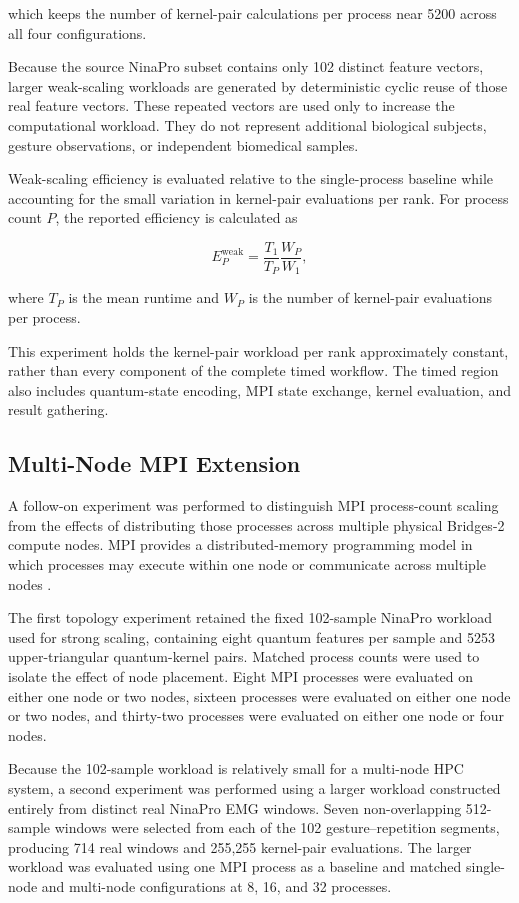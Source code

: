 \documentclass[pdflatex,sn-mathphys-num]{sn-jnl}%
\theoremstyle{thmstyleone}%
\theoremstyle{thmstyletwo}%
\theoremstyle{thmstylethree}%
\begin{document}
which keeps the number of kernel-pair calculations per process near 5200 across
all four configurations.

Because the source NinaPro subset contains only 102 distinct feature vectors,
larger weak-scaling workloads are generated by deterministic cyclic reuse of
those real feature vectors. These repeated vectors are used only to increase the
computational workload. They do not represent additional biological subjects,
gesture observations, or independent biomedical samples.

Weak-scaling efficiency is evaluated relative to the single-process baseline
while accounting for the small variation in kernel-pair evaluations per rank.
For process count \(P\), the reported efficiency is calculated as

\[
E^{\mathrm{weak}}_P
=
\frac{T_1}{T_P}
\frac{W_P}{W_1},
\]

where \(T_P\) is the mean runtime and \(W_P\) is the number of kernel-pair
evaluations per process.

This experiment holds the kernel-pair workload per rank approximately constant,
rather than every component of the complete timed workflow. The timed region
also includes quantum-state encoding, MPI state exchange, kernel evaluation,
and result gathering.


\subsection{Multi-Node MPI Extension}
\label{subsec:multinode-mpi-method}

A follow-on experiment was performed to distinguish MPI process-count scaling
from the effects of distributing those processes across multiple physical
Bridges-2 compute nodes. MPI provides a distributed-memory programming model
in which processes may execute within one node or communicate across multiple
nodes \cite{mpiforum2023,gropp2014usingmpi}.

The first topology experiment retained the fixed 102-sample NinaPro workload
used for strong scaling, containing eight quantum features per sample and
5253 upper-triangular quantum-kernel pairs. Matched process counts were used
to isolate the effect of node placement. Eight MPI processes were evaluated
on either one node or two nodes, sixteen processes were evaluated on either
one node or two nodes, and thirty-two processes were evaluated on either one
node or four nodes.

Because the 102-sample workload is relatively small for a multi-node HPC
system, a second experiment was performed using a larger workload constructed
entirely from distinct real NinaPro EMG windows. Seven non-overlapping
512-sample windows were selected from each of the 102 gesture--repetition
segments, producing 714 real windows and 255,255 kernel-pair evaluations.
The larger workload was evaluated using one MPI process as a baseline and
matched single-node and multi-node configurations at 8, 16, and 32 processes.
\end{document}
